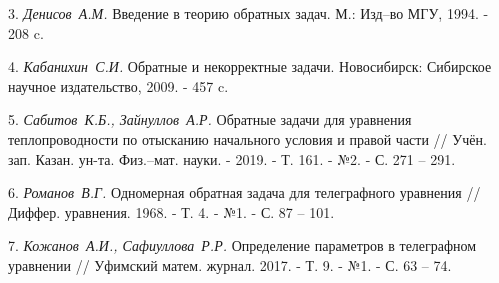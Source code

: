 3. {\it Денисов~А.М.} Введение в теорию обратных задач. М.: Изд--во МГУ, 1994. - 208 c.

4. {\it Кабанихин~С.И.} Обратные и некорректные задачи. Новосибирск: Сибирское научное
 издательство, 2009. - 457 c.

5. {\it Сабитов~К.Б., Зайнуллов~А.Р.} Обратные задачи для уравнения теплопроводности по отысканию
 начального условия и правой части // Учён. зап. Казан. ун-та. Физ.--мат. науки. - 2019. - Т. 161. - №2. - С. 271 -- 291.

6. {\it Романов~В.Г.} Одномерная обратная задача для телеграфного уравнения // Диффер. уравнения.
 1968. - Т. 4. - №1. - С. 87 -- 101.

7. {\it Кожанов~А.И., Сафиуллова~Р.Р.} Определение параметров в телеграфном уравнении // Уфимский
 матем. журнал. 2017. - Т. 9. - №1. - С. 63 -- 74.
